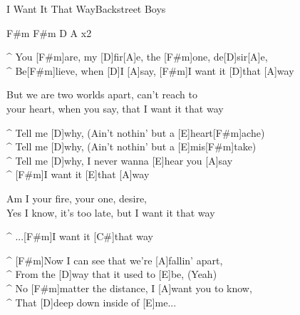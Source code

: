 \begin{song}{I Want It That Way}{Backstreet Boys}

\begin{guitar}
F#m F#m D A  x2\\
\end{guitar}

\begin{guitar}
^ You [F#m]are, my [D]fir[A]e, the [F#m]one, de[D]sir[A]e,\\
^ Be[F#m]lieve, when [D]I [A]say, [F#m]I want it [D]that [A]way\\
\end{guitar}

\begin{guitar}
But we are two worlds apart, can't reach to\\
your heart, when you say, that I want it that way\\
\end{guitar}


\begin{guitar}
^ Tell me [D]why, (Ain't nothin' but a [E]heart[F#m]ache)\\
^ Tell me [D]why, (Ain't nothin' but a [E]mis[F#m]take)\\
^ Tell me [D]why, I never wanna [E]hear you [A]say\\
^ [F#m]I want it [E]that [A]way\\
\end{guitar}


\begin{guitar}
Am I your fire, your one, desire,\\
Yes I know, it's too late, but I want it that way\\
\end{guitar}



\begin{guitar}
^ ...[F#m]I want it [C#]that way\\
\end{guitar}


\begin{guitar}
^ [F#m]Now I can see that we're [A]fallin' apart,\\
^ From the [D]way that it used to [E]be, (Yeah)\\
^ No [F#m]matter the distance, I [A]want you to know,\\
^ That [D]deep down inside of [E]me...\\
\end{guitar}



\end{song}
